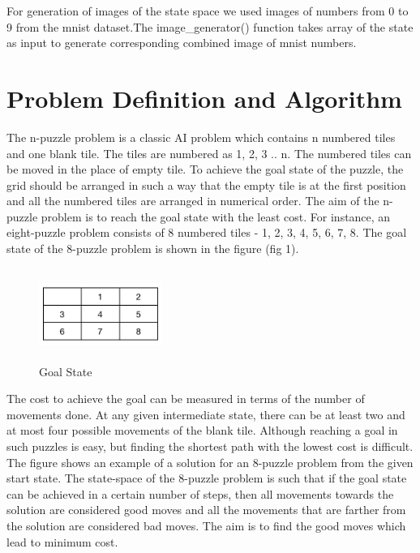 \documentclass{svproc}
\begin{document}
\noindent For generation of images of the state space we used images of numbers from 0 to 9 from the mnist  dataset.The image\_generator() function takes array of the state as input to generate corresponding combined image of mnist numbers.

\section{Problem Definition and Algorithm}
\noindent The n-puzzle problem is a classic AI problem which contains n numbered tiles and one blank tile. The tiles are numbered as 1, 2, 3 .. n. The numbered tiles can be moved in the place of empty tile. To achieve the goal state of the puzzle, the grid should be arranged in such a way that the empty tile is at the first position and all the numbered tiles are arranged in numerical order. The aim of the n-puzzle problem is to reach the goal state with the least cost. For instance, an eight-puzzle problem consists of 8 numbered tiles - 1, 2, 3, 4, 5, 6, 7, 8. The goal state of the 8-puzzle problem is shown in the figure (fig 1). \\

\begin{figure}
	\centering
	\includegraphics[width=4cm,height=3cm,keepaspectratio]{GoalState.png}
	\caption{Goal State}
	\label{fig:1}
\end{figure}


\noindent The cost to achieve the goal can be measured in terms of the number of movements done. At any given intermediate state, there can be at least two and at most four possible movements of the blank tile. Although reaching a goal in such puzzles is easy, but finding the shortest path with the lowest cost is difficult. The figure shows an example of a solution for an 8-puzzle problem from the given start state. The state-space of the 8-puzzle problem is such that if the goal state can be achieved in a certain number of steps, then all movements towards the solution are considered good moves and all the movements that are farther from the solution are considered bad moves. The aim is to find the good moves which lead to minimum cost. \\
\end{document}
